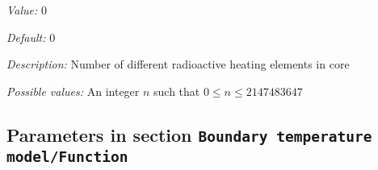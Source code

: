 \begin{itemize}
{\it Value:} 0


{\it Default:} 0


{\it Description:} Number of different radioactive heating elements in core


{\it Possible values:} An integer $n$ such that $0\leq n \leq 2147483647$
\end{itemize}

\subsection{Parameters in section \tt Boundary temperature model/Function}
\label{parameters:Boundary_20temperature_20model/Function}

